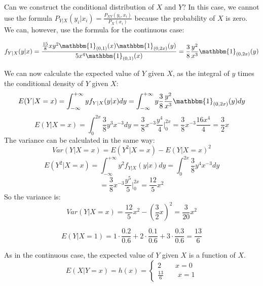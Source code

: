 Can we construct the conditional distribution of $X$ and $Y$?
In this case, we cannot use the formula $P_{Y|X}(y_i | x_i) = \frac{P_{XY}(y_i, x_i)}{P_{X}(x_i)}$ because the probability of $X$ is zero. We can, however, use the formula for the continuous case:

\[
f_{Y|X}(y|x) = \frac{\frac{15}{8}xy^2\mathbbm{1}_{(0,1)}(x) \mathbbm{1}_{(0,2x)}(y)}{5x^4 \mathbbm{1}_{(0,1)}(x)} = \frac{3}{8}\frac{y^2}{x^3} \mathbbm{1}_{(0,2x)}(y)
\]

We can now calculate the expected value of $Y$ given $X$, as the integral of $y$ times the conditional density of $Y$ given $X$:
\[
E(Y|X = x) = \int_{-\infty}^{+\infty} y f_{Y|X}(y|x) dy = \int_{-\infty}^{+\infty} y \frac{3}{8}\frac{y^2}{x^3} \mathbbm{1}_{(0,2x)}(y) dy
\]
\[
E(Y|X = x) = \int_{0}^{2x} \frac{3}{8} y^3 x^{-3} dy = \frac{3}{8} x^{-3} \frac{y^4}{4} \Big|_{0}^{2x} = \frac{3}{8} x^{-3} \frac{16x^4}{4} = \frac{3}{2}x
\]
The variance can be calculated in the same way:
\[
Var(Y|X = x) = E(Y^2|X = x) - E(Y|X = x)^2
\]
\[
E(Y^2|X = x) = \int_{-\infty}^{+\infty} y^2 f_{Y|X}(y|x) dy = \int_{0}^{2x} \frac{3}{8} y^4 x^{-3} dy
\]
\[
= \frac{3}{8} x^{-3} \frac{y^5}{5} \Big|_{0}^{2x} = \frac{12}{5}x^2
\]
So the variance is:
\[
Var(Y|X = x) = \frac{12}{5}x^2 - \left(\frac{3}{2}x\right)^2 = \frac{3}{20}x^2
\]



\[
E(Y|X = 1) = 1 \cdot \frac{0.2}{0.6} + 2 \cdot \frac{0.1}{0.6} + 3 \cdot \frac{0.3}{0.6} = \frac{13}{6}
\]

As in the continuous case, the expected value of $Y$ given $X$ is a function of $X$.
\[
E(X|Y = x) = h(x) = \begin{cases}
    2 \qquad x = 0 \\
    \frac{13}{6} \qquad x = 1
\end{cases}
\]

